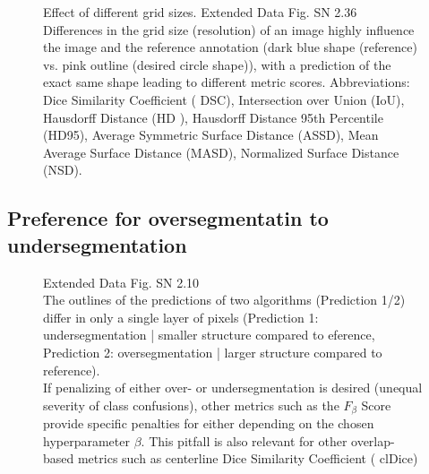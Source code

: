 \documentclass[11pt]{article}
\begin{document}
\begin{figure}[H]
    \centering
    \caption{Effect of different grid sizes. Extended Data Fig. SN 2.36~\cite{pitfalls-in-segmentation-evaluation}\\Differences in the grid size (resolution) of an
    image highly influence the image and the reference annotation (dark blue shape (reference) vs. pink
    outline (desired circle shape)), with a prediction of the exact same shape leading to different metric
    scores. Abbreviations: Dice Similarity Coefficient ( DSC), Intersection over Union (IoU), Hausdorff
    Distance (HD ), Hausdorff Distance 95th Percentile (HD95), Average Symmetric Surface Distance
    (ASSD), Mean Average Surface Distance (MASD), Normalized Surface Distance (NSD).}
\end{figure}

\subsection{Preference for oversegmentatin to undersegmentation}

\begin{figure}[H]
    \centering
    \caption{Extended Data Fig. SN 2.10~\cite{pitfalls-in-segmentation-evaluation}\\The outlines of the predictions of two algorithms (Prediction 1/2) differ in only a single layer of pixels (Prediction 1: undersegmentation | smaller structure compared to eference, Prediction 2: oversegmentation | larger structure compared to reference). \\
    If penalizing of either over- or undersegmentation is desired (unequal severity of class confusions), other metrics such as the $F_\beta$ Score provide specific penalties for either depending on the chosen hyperparameter $\beta$. This pitfall is also relevant for other overlap-based metrics such as centerline Dice Similarity Coefficient ( clDice)}
\end{figure}
\end{document}
